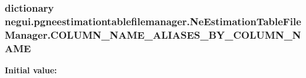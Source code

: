 \subsubsection[{\texorpdfstring{C\+O\+L\+U\+M\+N\+\_\+\+N\+A\+M\+E\+\_\+\+A\+L\+I\+A\+S\+E\+S\+\_\+\+B\+Y\+\_\+\+C\+O\+L\+U\+M\+N\+\_\+\+N\+A\+ME}{COLUMN_NAME_ALIASES_BY_COLUMN_NAME}}]{\setlength{\rightskip}{0pt plus 5cm}dictionary negui.\+pgneestimationtablefilemanager.\+Ne\+Estimation\+Table\+File\+Manager.\+C\+O\+L\+U\+M\+N\+\_\+\+N\+A\+M\+E\+\_\+\+A\+L\+I\+A\+S\+E\+S\+\_\+\+B\+Y\+\_\+\+C\+O\+L\+U\+M\+N\+\_\+\+N\+A\+ME\hspace{0.3cm}{\ttfamily [static]}}\hypertarget{classnegui_1_1pgneestimationtablefilemanager_1_1NeEstimationTableFileManager_a2b668632688f7788704ee39d634f5c53}{}\label{classnegui_1_1pgneestimationtablefilemanager_1_1NeEstimationTableFileManager_a2b668632688f7788704ee39d634f5c53}
{\bfseries Initial value\+:}
